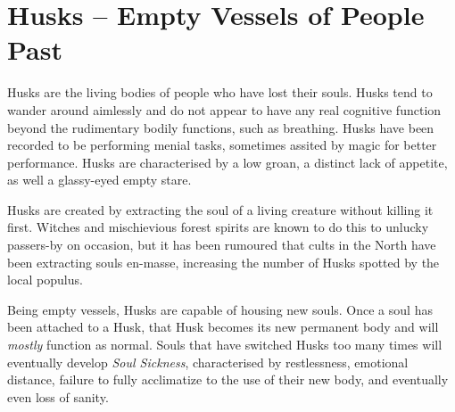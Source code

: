 \section{Husks -- Empty Vessels of People Past}
Husks are the living bodies of people who have lost their souls.
Husks tend to wander around aimlessly and do not appear to have any real cognitive function beyond the rudimentary bodily functions, such as breathing.
Husks have been recorded to be performing menial tasks, sometimes assited by magic for better performance.
Husks are characterised by a low groan, a distinct lack of appetite, as well a glassy-eyed empty stare.

Husks are created by extracting the soul of a living creature without killing it first.
Witches and mischievious forest spirits are known to do this to unlucky passers-by on occasion, but it has been rumoured that cults in the North have been extracting souls en-masse, increasing the number of Husks spotted by the local populus.

Being empty vessels, Husks are capable of housing new souls.
Once a soul has been attached to a Husk, that Husk becomes its new permanent body and will \textit{mostly} function as normal.
Souls that have switched Husks too many times will eventually develop \textit{Soul Sickness},  characterised by restlessness, emotional distance, failure to fully acclimatize to the use of their new body, and eventually even loss of sanity.